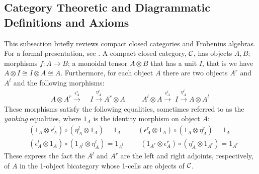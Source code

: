 \subsection{Category Theoretic and Diagrammatic Definitions and Axioms}
This subsection briefly reviews compact closed
categories and Frobenius algebras. For a formal presentation, see
\cite{KellyLaplaza80,Kock72}.  A compact closed category, $\mathcal{C}$, has objects $A, B$; morphisms $f \colon A
\to B$; a monoidal tensor $A \otimes B$ that has a unit $I$, that is we have $A \otimes I \cong I \otimes A \cong A$. Furthermore, for
each object $A$ there are two objects $A^r$ and $A^l$ and  the
following morphisms:
\begin{align*}
A \otimes A^r \stackrel{\epsilon_A^r} {\longrightarrow} \; &I
\stackrel{\eta_A^r}{\longrightarrow} A^r \otimes A \hspace{1cm}
A^l \otimes A \stackrel{\epsilon_A^l}{\longrightarrow} \; I
\stackrel{\eta_A^l}{\longrightarrow} A \otimes A^l\
\end{align*}
These morphisms satisfy the following equalities, sometimes
referred to as the \emph{yanking} equalities, where $1_A$ is the
identity morphism on object $A$:
\begin{align*}
& (1_A \otimes \epsilon_A^l) \circ (\eta_A^l \otimes 1_A)  = 1_A 
\hspace{1cm}
(\epsilon_A^r \otimes 1_A) \circ (1_A \otimes
  \eta_A^r)   = 1_A\\
& (\epsilon_A^l \otimes 1_A) \circ (1_{A^l} \otimes
  \eta_A^l) = 1_{A^l}  
    \hspace{1cm}
    (1_{A^r} \otimes \epsilon_A^r) \circ (\eta_A^r \otimes 1_{A^r}) = 1_{A^r}
\end{align*}
%
\noindent These express the fact the $A^l$ and $A^r$ are the left and right
adjoints, respectively, of $A$ in the 1-object bicategory whose
1-cells are objects of $\mathcal{C}$.


